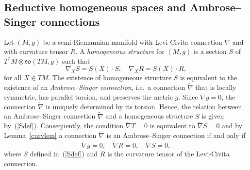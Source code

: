 \documentclass[11pt,a4paper]{amsart}
\newcommand{\tnab}{\widetilde{\nabla}}
\newcommand{\tR}{\widetilde{R}}
\newcommand{\+}{\oplus}
\newcommand{\so}{\mathfrak{so}}
\newcommand{\1}{\mathbf{1}}
\newcommand{\<}{\langle}
\renewcommand{\>}{\rangle}
\theoremstyle{definition}
\theoremstyle{plain}
\numberwithin{equation}{section}
\begin{document}
\subsection{Reductive  homogeneous spaces and Ambrose--Singer connections}\label{review}
Let $(M,g)$ be a semi-Riemannian manifold with Levi-Civita connection $\nabla$ and with curvature tensor $R$. A {\em homogeneous structure} for $(M,g)$ is a section $S$ of $T^*M\otimes \so(TM,g)$ such that
\[\nabla_XS=
S(X)\cdot S,\quad \nabla_XR=S(X)\cdot R,\]
for all $X \in TM$. 
The existence of  homogeneous structure $S$ is equivalent to the existence of an {\em Ambrose--Singer connection}, i.e.~a connection $\tnab$  that is locally symmetric, has parallel torsion, and preserves the metric $g$.
Since $\tnab g=0$, the connection $\tnab$ is uniquely determined by its torsion. Hence, the relation between an Ambrose--Singer connection $\tnab $ and a homogeneous structure $S$ is given by~(\ref{Sdef}).
Consequently, the condition $\tnab T=0$ is equivalent to $\tnab S=0$ and 
by Lemma~\ref{curvlem} a connection $\tnab$ is an Ambrose--Singer connection if and only if
\begin{equation}\label{ASdef1}\tnab g=0,\quad \tnab R=0,\quad \tnab S=0,\end{equation}
where $S$ defined in~(\ref{Sdef}) and $R$ is the  curvature tensor of the Levi-Civita connection.
\end{document}
